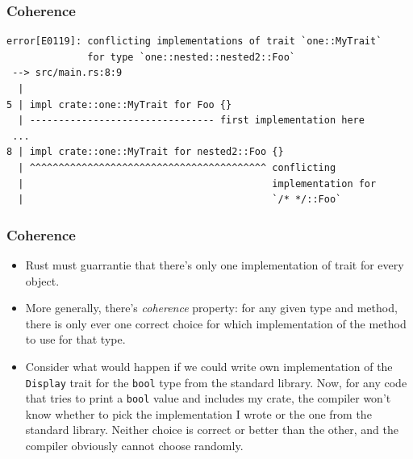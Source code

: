 \documentclass[aspectratio=1610,t]{beamer}
\begin{document}

\begin{frame}[fragile]
\frametitle{Coherence}
\begin{verbatim}
error[E0119]: conflicting implementations of trait `one::MyTrait`
              for type `one::nested::nested2::Foo`
 --> src/main.rs:8:9
  |
5 | impl crate::one::MyTrait for Foo {}
  | -------------------------------- first implementation here
 ...
8 | impl crate::one::MyTrait for nested2::Foo {}
  | ^^^^^^^^^^^^^^^^^^^^^^^^^^^^^^^^^^^^^^^^^ conflicting
  |                                           implementation for
  |                                           `/* */::Foo`
\end{verbatim}
\end{frame}


\begin{frame}[fragile]
\frametitle{Coherence}
\begin{itemize}
    \item<1-> Rust must guarrantie that there's only one implementation of trait for every object.
    \item<2-> More generally, there's \textit{coherence} property: for any given type and method, there is only ever one correct choice for which implementation of the method to use for that type.
    \item<3-> Consider what would happen if we could write own implementation of the \texttt{Display} trait for the \texttt{bool} type from the standard library. Now, for any code that tries to print a \texttt{bool} value and includes my crate, the compiler won't know whether to pick the implementation I wrote or the one from the standard library. Neither choice is correct or better than the other, and the compiler obviously cannot choose randomly.
\end{itemize}
\end{frame}

\end{document}
